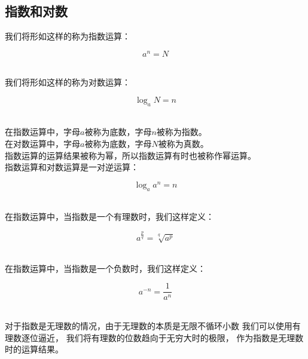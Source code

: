 \documentclass[UTF8]{ctexart}
\begin{document}
\subsection{指数和对数}
    我们将形如这样的称为指数运算：
    \begin{large}
        \begin{equation*}
            a^n=N
        \end{equation*}
    \end{large}\\
    我们将形如这样的称为对数运算：
    \begin{large}
        \begin{equation*}
            \log_{a}{N}=n
        \end{equation*}
    \end{large}\\
    在指数运算中，字母$a$被称为底数，字母$n$被称为指数。\\[2mm]
    在对数运算中，字母$a$被称为底数，字母$N$被称为真数。\\[2mm]
    指数运算的运算结果被称为幂，所以指数运算有时也被称作幂运算。\\[3mm]
    指数运算和对数运算是一对逆运算：
    \begin{large}
        \begin{equation*}
            \log_{a}{a^n}=n
        \end{equation*}
    \end{large}\\
    在指数运算中，当指数是一个有理数时，我们这样定义：
    \begin{large}
        \begin{equation*}
            a^\frac{p}{q}=\sqrt[q]{a^p}
        \end{equation*}
    \end{large}\\
    在指数运算中，当指数是一个负数时，我们这样定义：
    \begin{large}
        \begin{equation*}
            a^{-n}=\frac{1}{a^n}
        \end{equation*}
    \end{large}\\
    对于指数是无理数的情况，由于无理数的本质是无限不循环小数
    我们可以使用有理数逐位逼近，
    我们将有理数的位数趋向于无穷大时的极限，
    作为指数是无理数时的运算结果。\\[3mm]

\newpage
\end{document}
